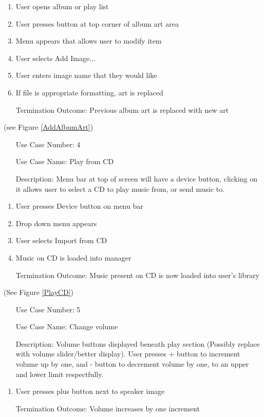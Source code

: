 \documentclass[10pt,conference,onecolumn,compsoc]{IEEEtran}
\begin{document}
\begin{enumerate}
\item User opens album or play list
\item User presses button at top corner of album art area
\item Menu appears that allows user to modify item
\item User selects Add Image...
\item User enters image name that they would like
\item If file is appropriate formatting, art is replaced
\item [Termination Outcome:] Previous album art is replaced with new art
\end{enumerate}

(see Figure \ref{AddAlbumArt})

\begin{itemize}
\item[Use Case Number:] 4
\item[Use Case Name:] Play from CD
\item[Description:] Menu bar at top of screen will have a device button, clicking on it allows user to select a CD to play music from, or send music to.
\end{itemize}

\begin{enumerate}
\item User presses Device button on menu bar
\item Drop down menu appears
\item User selects Import from CD
\item Music on CD is loaded into manager
\item [Termination Outcome:] Music present on CD is now loaded into user's library
\end{enumerate}

(See Figure \ref{PlayCD})

\begin{itemize}
\item[Use Case Number:] 5
\item[Use Case Name:] Change volume
\item[Description:] Volume buttons displayed beneath play section (Possibly replace with volume slider/better display). User presses + button to increment volume up by one, and - button to decrement volume by one, to an upper and lower limit respectfully.
\end{itemize}

\begin{enumerate}
\item User presses plus button next to speaker image
\item [Termination Outcome:] Volume increases by one increment
\end{enumerate}
\end{document}

